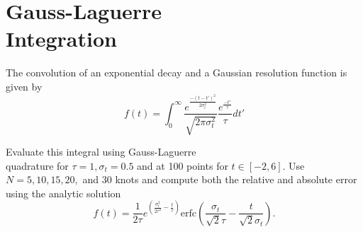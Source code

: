 \section{Gauss-Laguerre \\ Integration}

The convolution of an exponential decay and a Gaussian resolution function is given by
\begin{equation}
    f(t)=\int^\infty_0 \frac{e^{\frac{-(t-t')^2}{2\sigma^2_t}}}{\sqrt{2\pi\sigma^2_t}}\frac{e^{\frac{-t'}{\tau}}}{\tau}dt'
\end{equation}

Evaluate this integral using Gauss-Laguerre \\ quadrature for $\tau=1,\sigma_t=0.5$ and at 100 points for $t\in[-2,6]$. Use $N=5,10,15,20,$ and $30$ knots and compute both the relative and absolute
error using the analytic solution
\begin{equation}
    f(t)=\frac{1}{2\tau}e^{\left(\frac{\sigma^2_t}{2\tau^2}-\frac{t}{\tau}\right)}\mathrm{erfc}\left(\frac{\sigma_t}{\sqrt{2}\tau}-\frac{t}{\sqrt{2}\sigma_t}\right).
\end{equation}

